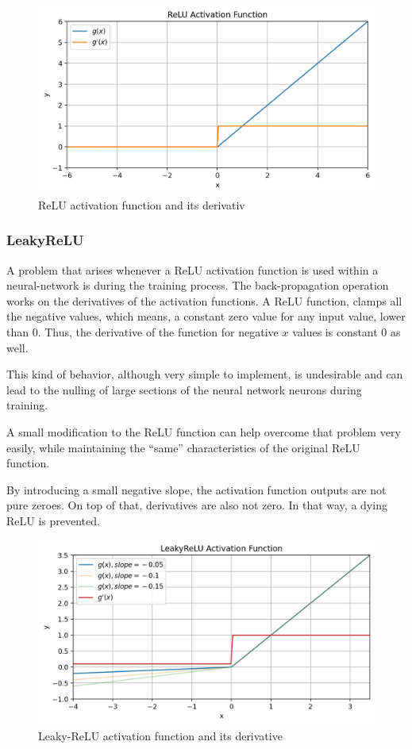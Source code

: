 \begin{figure}[H]
    \centering
    \includegraphics[width=0.75\linewidth]{ANN/images/relu}
    \caption{ReLU activation function and its derivativ}\label{fig:relu_af}
\end{figure}

% 

\subsubsection{LeakyReLU}
A problem that arises whenever a
ReLU activation function is used within a neural-network
is during the training process.
The back-propagation operation
works on the derivatives of the activation functions.
A ReLU function, clamps all the negative values,
which means, a constant zero value for any input value,
lower than 0. Thus, the derivative of the function
for negative \(x\) values is constant 0 as well.

This kind of behavior, although very simple to implement,
is undesirable and can lead to the nulling of large
sections of the neural network neurons during training.

A small modification to the
ReLU function can help overcome that
problem very easily, while maintaining
the ``same'' characteristics of the
original ReLU function.

By introducing a small negative slope,
the activation function outputs are not pure zeroes.
On top of that, derivatives are also not zero. In that
way, a dying ReLU is prevented.

\begin{figure}[H]
    \centering
    \includegraphics[width=0.75\linewidth]{ANN/images/leakyrelu}
    \caption{Leaky-ReLU activation function and its derivative}\label{fig:leakyrelu_af}
\end{figure}

